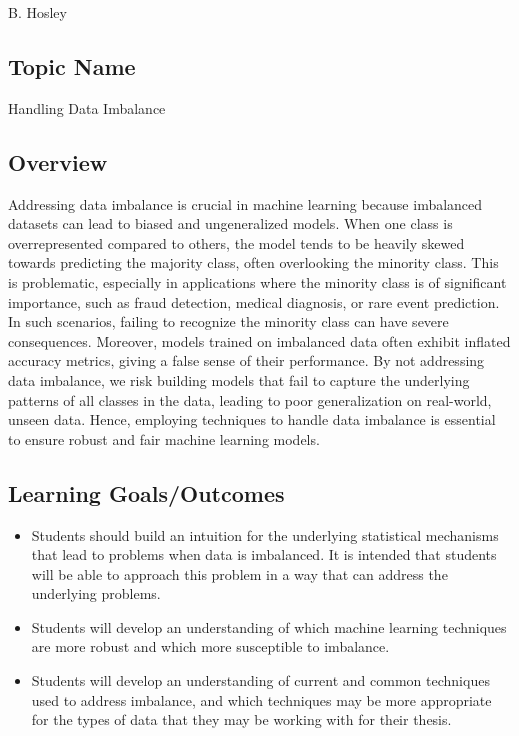 \documentclass[12pt]{amsart}
\begin{document}
\raggedbottom

\hspace{\fill} {\large B. Hosley}
\bigskip

\subsection{Topic Name}
Handling Data Imbalance

\subsection{Overview}
Addressing data imbalance is crucial in machine learning because imbalanced datasets can lead to biased and ungeneralized models. When one class is overrepresented compared to others, the model tends to be heavily skewed towards predicting the majority class, often overlooking the minority class. This is problematic, especially in applications where the minority class is of significant importance, such as fraud detection, medical diagnosis, or rare event prediction. In such scenarios, failing to recognize the minority class can have severe consequences. Moreover, models trained on imbalanced data often exhibit inflated accuracy metrics, giving a false sense of their performance. By not addressing data imbalance, we risk building models that fail to capture the underlying patterns of all classes in the data, leading to poor generalization on real-world, unseen data. Hence, employing techniques to handle data imbalance is essential to ensure robust and fair machine learning models.

\subsection{Learning Goals/Outcomes}
\begin{itemize}
	\item Students should build an intuition for the underlying statistical mechanisms that lead to problems when data is imbalanced.
		It is intended that students will be able to approach this problem in a way that can address the underlying problems.
	\item Students will develop an understanding of which machine learning techniques are more robust and which more susceptible to imbalance.
	\item Students will develop an understanding of current and common techniques used to address imbalance, 
		and which techniques may be more appropriate for the types of data that they may be working with for their thesis.
\end{itemize}
\end{document}
